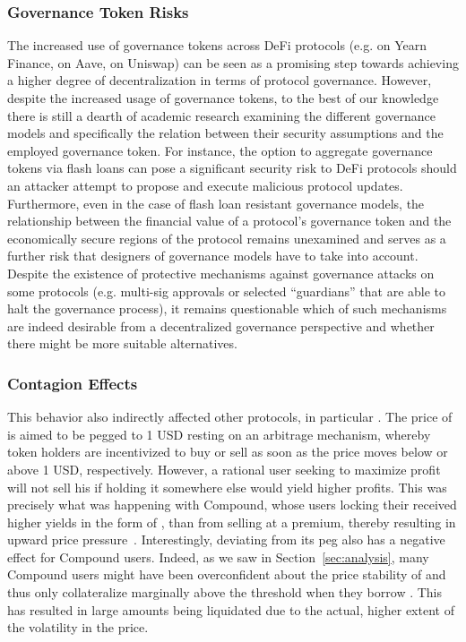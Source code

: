 \subsubsection{Governance Token Risks}
The increased use of governance tokens across DeFi protocols (e.g.  on Yearn Finance,  on Aave,  on Uniswap) can be seen as a promising step towards achieving a higher degree of decentralization in terms of protocol governance. 
However, despite the increased usage of governance tokens, to the best of our knowledge there is still a dearth of academic research examining the different governance models and specifically the relation between their security assumptions and the employed governance token.
For instance, the option to aggregate governance tokens via flash loans \cite{Wang2020} can pose a significant security risk to DeFi protocols should an attacker attempt to propose and execute malicious protocol updates.
Furthermore, even in the case of flash loan resistant governance models, the relationship between the financial value of a protocol's governance token and the economically secure regions of the protocol remains unexamined and serves as a further risk that designers of governance models have to take into account.
Despite the existence of protective mechanisms against governance attacks on some protocols (e.g. multi-sig approvals or selected ``guardians'' that are able to halt the governance process), it remains questionable which of such mechanisms are indeed desirable from a decentralized governance perspective and whether there might be more suitable alternatives.

\subsubsection{Contagion Effects}
This behavior also indirectly affected other protocols, in particular .
The price of  is aimed to be pegged to 1 USD resting on an arbitrage mechanism, whereby token holders are incentivized to buy or sell  as soon as the price moves below or above 1 USD, respectively.
However, a rational user seeking to maximize profit will not sell his  if holding it somewhere else would yield higher profits.
This was precisely what was happening with Compound, whose users locking their  received higher yields in the form of , than from selling  at a premium, thereby resulting in upward price pressure~\cite{cyrus2020upcoming}.
Interestingly,  deviating from its peg also has a negative effect for Compound users.
Indeed, as we saw in Section~\ref{sec:analysis}, many Compound users might have been overconfident about the price stability of  and thus only collateralize marginally above the threshold when they borrow .
This has resulted in large amounts being liquidated due to the actual, higher extent of the volatility in the  price.


